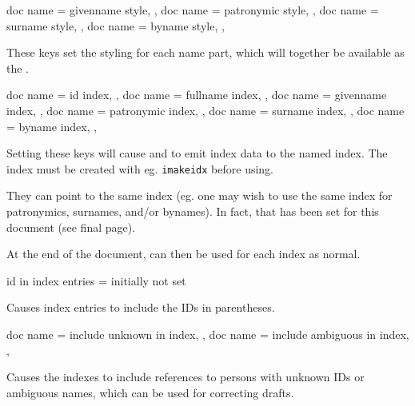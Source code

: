 \documentclass[
	a4paper,
]{article}
\begin{document}
\begin{docKeys}
	[
		doc parameter = {=\meta{...}},
		doc description = {initially not set},
	]
	{
		{
			doc name = givenname style,
		},
		{
			doc name = patronymic style,
		},
		{
			doc name = surname style,
		},
		{
			doc name = byname style,
		},
	}

	These keys set the styling for each name part, which will together be available as the .

\end{docKeys}

\begin{docKeys}
	[
		doc parameter = {=\meta{...}},
		doc description = {initially not set},
	]
	{
		{
			doc name = id index,
		},
		{
			doc name = fullname index,
		},
		{
			doc name = givenname index,
		},
		{
			doc name = patronymic index,
		},
		{
			doc name = surname index,
		},
		{
			doc name = byname index,
		},
	}

	Setting these keys will cause  and  to emit index data to the named index. The index must be created with eg. \texttt{imakeidx} before using.

	They can point to the same index (eg. one may wish to use the same index for patronymics, surnames, and/or bynames). In fact, that has been set for this document (see final page).

	At the end of the document,  can then be used for each index as normal.

\end{docKeys}

\begin{docKey}
	{id in index entries}
	{=}
	{initially not set}

	Causes index entries to include the IDs in parentheses.
\end{docKey}

\begin{docKeys}
	[
		doc parameter = {=\meta{true/false}},
		doc description = {initially not set},
	]
	{
		{
			doc name = include unknown in index,
		},
		{
			doc name = include ambiguous in index,
		},
	}

	Causes the indexes to include references to persons with unknown IDs or ambiguous names, which can be used for correcting drafts.

\end{docKeys}
\end{document}
